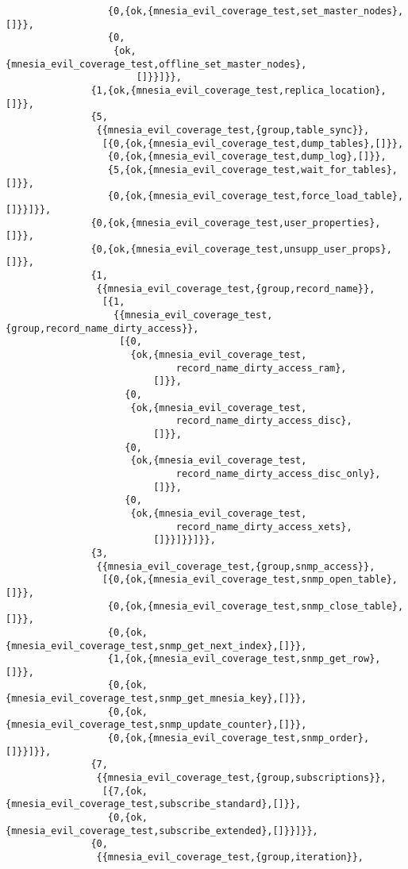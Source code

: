 \begin{verbatim}
                  {0,{ok,{mnesia_evil_coverage_test,set_master_nodes},[]}},
                  {0,
                   {ok,{mnesia_evil_coverage_test,offline_set_master_nodes},
                       []}}]}},
               {1,{ok,{mnesia_evil_coverage_test,replica_location},[]}},
               {5,
                {{mnesia_evil_coverage_test,{group,table_sync}},
                 [{0,{ok,{mnesia_evil_coverage_test,dump_tables},[]}},
                  {0,{ok,{mnesia_evil_coverage_test,dump_log},[]}},
                  {5,{ok,{mnesia_evil_coverage_test,wait_for_tables},[]}},
                  {0,{ok,{mnesia_evil_coverage_test,force_load_table},[]}}]}},
               {0,{ok,{mnesia_evil_coverage_test,user_properties},[]}},
               {0,{ok,{mnesia_evil_coverage_test,unsupp_user_props},[]}},
               {1,
                {{mnesia_evil_coverage_test,{group,record_name}},
                 [{1,
                   {{mnesia_evil_coverage_test,{group,record_name_dirty_access}},
                    [{0,
                      {ok,{mnesia_evil_coverage_test,
                              record_name_dirty_access_ram},
                          []}},
                     {0,
                      {ok,{mnesia_evil_coverage_test,
                              record_name_dirty_access_disc},
                          []}},
                     {0,
                      {ok,{mnesia_evil_coverage_test,
                              record_name_dirty_access_disc_only},
                          []}},
                     {0,
                      {ok,{mnesia_evil_coverage_test,
                              record_name_dirty_access_xets},
                          []}}]}}]}},
               {3,
                {{mnesia_evil_coverage_test,{group,snmp_access}},
                 [{0,{ok,{mnesia_evil_coverage_test,snmp_open_table},[]}},
                  {0,{ok,{mnesia_evil_coverage_test,snmp_close_table},[]}},
                  {0,{ok,{mnesia_evil_coverage_test,snmp_get_next_index},[]}},
                  {1,{ok,{mnesia_evil_coverage_test,snmp_get_row},[]}},
                  {0,{ok,{mnesia_evil_coverage_test,snmp_get_mnesia_key},[]}},
                  {0,{ok,{mnesia_evil_coverage_test,snmp_update_counter},[]}},
                  {0,{ok,{mnesia_evil_coverage_test,snmp_order},[]}}]}},
               {7,
                {{mnesia_evil_coverage_test,{group,subscriptions}},
                 [{7,{ok,{mnesia_evil_coverage_test,subscribe_standard},[]}},
                  {0,{ok,{mnesia_evil_coverage_test,subscribe_extended},[]}}]}},
               {0,
                {{mnesia_evil_coverage_test,{group,iteration}},

\end{verbatim}
